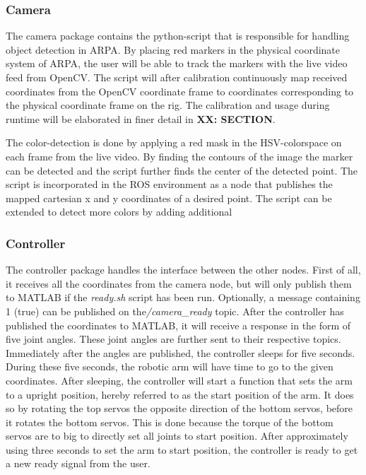 \documentclass[11pt,a4paper, titlepage]{article}
\begin{document}
	
\subsubsection{Camera}
The camera package contains the python-script that is responsible for handling object detection in ARPA. By placing red markers in the physical coordinate system of ARPA, the user will be able to track the markers with the live video feed from OpenCV. The script will after calibration continuously map received coordinates from the OpenCV coordinate frame to coordinates corresponding to the physical coordinate frame on the rig. The calibration and usage during runtime will be elaborated in finer detail in \textbf{XX: SECTION}.

The color-detection is done by applying a red mask in the HSV-colorspace on each frame from the live video. By finding the contours of the image the marker can be detected and the script further finds the center of the detected point. The script is incorporated in the ROS environment as a node that publishes the mapped cartesian x and y coordinates of a desired point. The script can be extended to detect more colors by adding additional

\subsubsection{Controller}
The controller package handles the interface between the other nodes. First of all, it receives all the coordinates from the camera node, but will only publish them to MATLAB if the \textit{ready.sh} script has been run. Optionally, a message containing 1 (true) can be published on the\textit{/camera\_ready} topic. After the controller has published the coordinates to MATLAB, it will receive a response in the form of five joint angles. These joint angles are further sent to their respective topics. Immediately after the angles are published, the controller sleeps for five seconds. During these five seconds, the robotic arm will have time to go to the given coordinates. After sleeping, the controller will start a function that sets the arm to a upright position, hereby referred to as the start position of the arm. It does so by rotating the top servos the opposite direction of the bottom servos, before it rotates the bottom servos. This is done because the torque of the bottom servos are to big to directly set all joints to start position. After approximately using three seconds to set the arm to start position, the controller is ready to get a new ready signal from the user.
\end{document}
